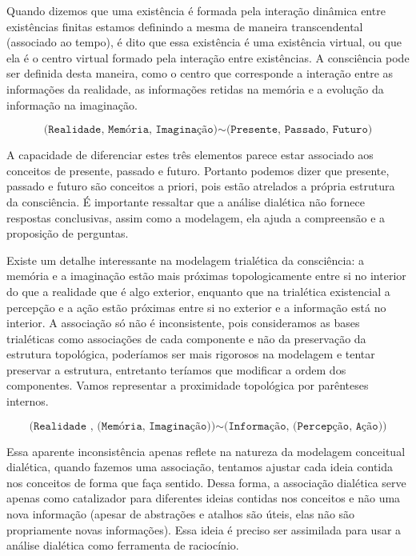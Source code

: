\documentclass[10pt,a4paper]{report}
\begin{document}
Quando dizemos que uma existência é formada pela interação dinâmica entre existências finitas estamos definindo a mesma de maneira transcendental (associado ao tempo), é dito que essa existência é uma existência virtual, ou que ela é o centro virtual formado pela interação entre existências. A consciência pode ser definida desta maneira, como o centro que corresponde a interação entre as informações da realidade, as informações retidas na memória e a evolução da informação na imaginação.

$$ \texttt{(Realidade, Memória, Imaginação)} \sim \texttt{(Presente, Passado, Futuro)} $$

A capacidade de diferenciar estes três elementos parece estar associado aos conceitos de presente, passado e futuro. Portanto podemos dizer que presente, passado e futuro são conceitos a priori, pois estão atrelados a própria estrutura da consciência. É importante ressaltar que a análise dialética não fornece respostas conclusivas, assim como a modelagem, ela ajuda a compreensão e a proposição de perguntas.

\hspace{\baselineskip}

Existe um detalhe interessante na modelagem trialética da consciência: a memória e a imaginação estão mais próximas topologicamente entre si no interior do que a realidade que é algo exterior, enquanto que na trialética existencial a percepção e a ação estão próximas entre si no exterior e a informação está no interior. A associação só não é inconsistente, pois consideramos as bases trialéticas como associações de cada componente e não da preservação da estrutura topológica, poderíamos ser mais rigorosos na modelagem e tentar preservar a estrutura, entretanto teríamos que modificar a ordem dos componentes. Vamos representar a proximidade topológica por parênteses internos.

$$ \texttt{(Realidade , (Memória, Imaginação))} \sim \texttt{(Informação, (Percepção, Ação))} $$

Essa aparente inconsistência apenas reflete na natureza da modelagem conceitual dialética, quando fazemos uma associação, tentamos ajustar cada ideia contida nos conceitos de forma que faça sentido. Dessa forma, a associação dialética serve apenas como catalizador para diferentes ideias contidas nos conceitos e não uma nova informação (apesar de abstrações e atalhos são úteis, elas não são propriamente novas informações). Essa ideia é preciso ser assimilada para usar a análise dialética como ferramenta de raciocínio.\\
\end{document}
